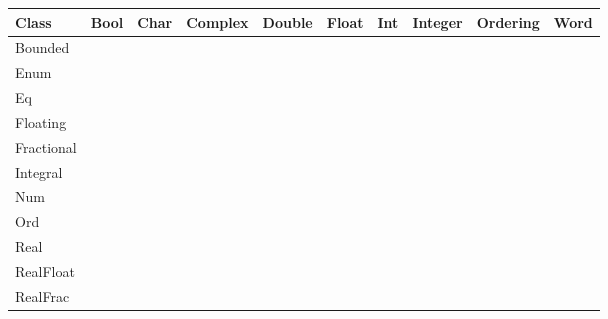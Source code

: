\documentclass[openany, 11pt]{book}
\begin{document}
\begin{center}
	\begin{tabular}{lccccccccc}
		\toprule
		Class      & Bool         & Char         & Complex      & Double       & Float        & Int          & Integer      & Ordering     & Word         \\
		\midrule
		Bounded    & \checkmark{} & \checkmark{} &              &              &              & \checkmark{} &              & \checkmark{} & \checkmark{} \\
		Enum       & \checkmark{} & \checkmark{} &              & \checkmark{} & \checkmark{} & \checkmark{} & \checkmark{} & \checkmark{} & \checkmark{} \\
		Eq         & \checkmark{} & \checkmark{} & \checkmark{} & \checkmark{} & \checkmark{} & \checkmark{} & \checkmark{} & \checkmark{} & \checkmark{} \\
		Floating   &              &              & \checkmark{} & \checkmark{} & \checkmark{} &              &              &              &              \\
		Fractional &              &              & \checkmark{} & \checkmark{} & \checkmark{} &              &              &              &              \\
		Integral   &              &              &              &              &              & \checkmark{} & \checkmark{} &              & \checkmark{} \\
		Num        &              &              & \checkmark{} & \checkmark{} & \checkmark{} & \checkmark{} & \checkmark{} &              & \checkmark{} \\
		Ord        & \checkmark{} & \checkmark{} &              & \checkmark{} & \checkmark{} & \checkmark{} & \checkmark{} & \checkmark{} & \checkmark{} \\
		Real       &              &              &              & \checkmark{} & \checkmark{} & \checkmark{} & \checkmark{} &              & \checkmark{} \\
		RealFloat  &              &              & \checkmark{} & \checkmark{} & \checkmark{} &              &              &              &              \\
		RealFrac   &              &              &              & \checkmark{} & \checkmark{} &              &              &              &              \\
		\bottomrule
	\end{tabular}
\end{center}
\end{document}
